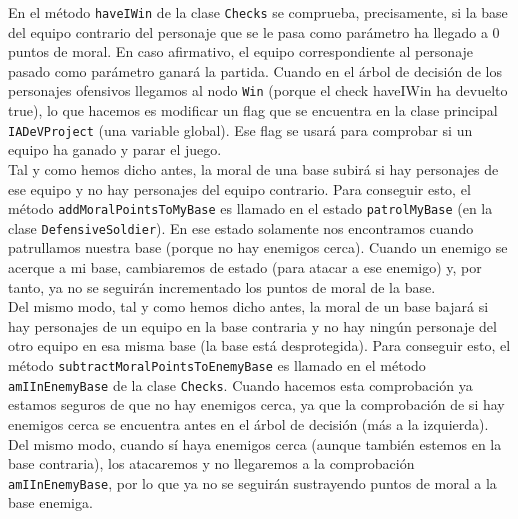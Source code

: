 En el método \texttt{haveIWin} de la clase \texttt{Checks} se comprueba, precisamente, si la base del equipo contrario del personaje que se le pasa como parámetro ha llegado a 0 puntos de moral. En caso afirmativo, el equipo correspondiente al personaje pasado como parámetro ganará la partida. Cuando en el árbol de decisión de los personajes ofensivos llegamos al nodo \texttt{Win} (porque el check haveIWin ha devuelto true), lo que hacemos es modificar un flag que se encuentra en la clase principal \texttt{IADeVProject} (una variable global). Ese flag se usará para comprobar si un equipo ha ganado y parar el juego. \\

Tal y como hemos dicho antes, la moral de una base subirá si hay personajes de ese equipo y no hay personajes del equipo contrario. Para conseguir esto, el método \texttt{addMoralPointsToMyBase} es llamado en el estado \texttt{patrolMyBase} (en la clase \texttt{DefensiveSoldier}). En ese estado solamente nos encontramos cuando patrullamos nuestra base (porque no hay enemigos cerca). Cuando un enemigo se acerque a mi base, cambiaremos de estado (para atacar a ese enemigo) y, por tanto, ya no se seguirán incrementado los puntos de moral de la base. \\

Del mismo modo, tal y como hemos dicho antes, la moral de un base bajará si hay personajes de un equipo en la base contraria y no hay ningún personaje del otro equipo en esa misma base (la base está desprotegida). Para conseguir esto, el método \texttt{subtractMoralPointsToEnemyBase} es llamado en el método \texttt{amIInEnemyBase} de la clase \texttt{Checks}. Cuando hacemos esta comprobación ya estamos seguros de que no hay enemigos cerca, ya que la comprobación de si hay enemigos cerca se encuentra antes en el árbol de decisión (más a la izquierda). Del mismo modo, cuando sí haya enemigos cerca (aunque también estemos en la base contraria), los atacaremos y no llegaremos a la comprobación \texttt{amIInEnemyBase}, por lo que ya no se seguirán sustrayendo puntos de moral a la base enemiga.
